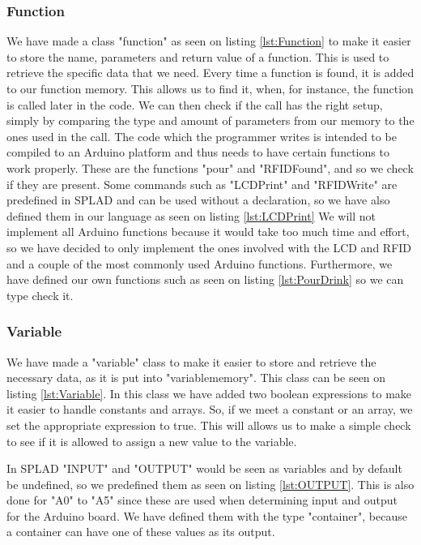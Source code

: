 \subsubsection{Function}
\label{sec:Function}
We have made a class "function" as seen on listing \ref{lst:Function} to make it easier to store the name, parameters and return value of a function. This is used to retrieve the specific data that we need. Every time a function is found, it is added to our function memory. This allows us to find it, when, for instance, the function is called later in the code. We can then check if the call has the right setup, simply by comparing the type and amount of parameters from our memory to the ones used in the call.
The code which the programmer writes is intended to be compiled to an Arduino platform and thus needs to have certain functions to work properly. These are the functions "pour" and "RFIDFound", and so we check if they are present. Some commands such as "LCDPrint" and "RFIDWrite" are predefined in SPLAD and can be used without a declaration, so we have also defined them in our language as seen on listing \ref{lst:LCDPrint}
We will not implement all Arduino functions because it would take too much time and effort, so we have decided to only implement the ones involved with the LCD and RFID and a couple of the most commonly used Arduino functions. Furthermore, we have defined our own functions such as seen on listing \ref{lst:PourDrink} so we can type check it.

\subsubsection{Variable}
\label{sec:Variable}
We have made a "variable" class to make it easier to store and retrieve the necessary data, as it is put into "variablememory". This class can be seen on listing \ref{lst:Variable}. In this class we have added two boolean expressions to make it easier to handle constants and arrays. So, if we meet a constant or an array, we set the appropriate expression to true. This will allows us to make a simple check to see if it is allowed to assign a new value to the variable.

In SPLAD "INPUT" and "OUTPUT" would be seen as variables and by default be undefined, so we predefined them as seen on listing \ref{lst:OUTPUT}. This is also done for "A0" to "A5" since these are used when determining input and output for the Arduino board. We have defined them with the type "container", because a container can have one of these values as its output.

